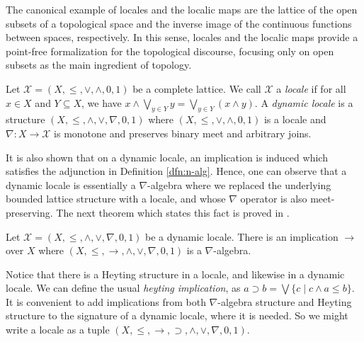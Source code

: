   The canonical example of locales and the localic maps are the lattice of the open subsets of a topological space and the inverse image of the continuous functions between spaces, respectively. In this sense, locales and the localic maps provide a point-free formalization for the topological discourse, focusing only on open subsets as the main ingredient of topology.

  \begin{dfn}
    Let $\mathcal{X} = (X, \le, \vee, \wedge, 0, 1)$ be a complete lattice. We call $\mathcal{X}$ a \emph{locale} if for all $x \in X$ and $Y \subseteq X$, we have $x \wedge \bigvee_{y \in Y} y = \bigvee_{y \in Y} (x \wedge y)$.
    A \emph{dynamic locale} is a structure $(X, \le, \wedge, \vee, \nabla, 0, 1)$ where $(X, \le, \vee, \wedge, 0, 1)$ is a locale and $\nabla : X \rightarrow \mathcal X$ is monotone and preserves binary meet and arbitrary joins.
  \end{dfn}

  It is also shown that on a dynamic locale, an implication is induced which satisfies the adjunction in Definition \ref{dfn:n-alg}. Hence, one can observe that a dynamic locale is essentially a $\nabla$-algebra where we replaced the underlying bounded lattice structure with a locale, and whose $\nabla$ operator is also meet-preserving. The next theorem which states this fact is proved in \cite{amir}.
  
  \begin{thm}
    Let $\mathcal{X} = (X, \le, \wedge, \vee, \nabla, 0, 1)$ be a dynamic locale. There is an implication $\rightarrow$ over $X$ where $(X, \le, \rightarrow, \wedge, \vee, \nabla, 0, 1)$ is a $\nabla$-algebra.
  \end{thm}

  Notice that there is a Heyting structure in a locale, and likewise in a dynamic locale. We can define the usual \emph{heyting implication}, as $a \supset b = \bigvee \{c \mid c \wedge a \le b\}$. It is convenient to add implications from both $\nabla$-algebra structure and Heyting structure to the signature of a dynamic locale, where it is needed. So we might write a locale as a tuple $(X, \le, \rightarrow, \supset, \wedge, \vee, \nabla, 0, 1)$.

